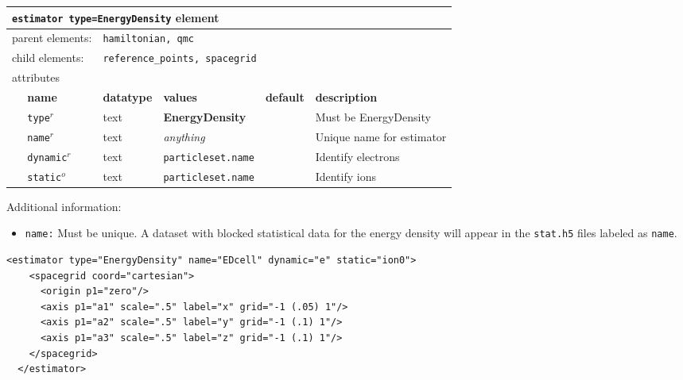 \FloatBarrier
\begin{table}[h]
\begin{center}
\begin{tabularx}{\textwidth}{l l l l l X }
\hline
\multicolumn{6}{l}{\texttt{estimator type=EnergyDensity} element} \\
\hline
\multicolumn{2}{l}{parent elements:} & \multicolumn{4}{l}{\texttt{hamiltonian, qmc}}\\
\multicolumn{2}{l}{child  elements:} & \multicolumn{4}{l}{\texttt{reference\_points, spacegrid}}\\
\multicolumn{2}{l}{attributes}  & \multicolumn{4}{l}{}\\
   &   \bfseries name     & \bfseries datatype & \bfseries values & \bfseries default   & \bfseries description \\
   & \texttt{type}$^r$    &  text              & \textbf{EnergyDensity}    &                  & Must be EnergyDensity     \\
   & \texttt{name}$^r$    &  text              & \textit{anything}         &                  & Unique name for estimator \\
   & \texttt{dynamic}$^r$ &  text              & \texttt{particleset.name} &                  & Identify electrons \\
   & \texttt{static}$^o$  &  text              & \texttt{particleset.name} &                  & Identify ions  \\
   
  \hline
\end{tabularx}
\end{center}
\end{table}
\FloatBarrier

Additional information:
\begin{itemize}
  \item{\texttt{name:}  Must be unique.  A dataset with blocked statistical data for the energy density will appear in the \texttt{stat.h5} files labeled as \texttt{name}.}
\end{itemize}


\begin{lstlisting}[style=QMCPXML,caption=Energy density estimator accumulated on a $20 \times  10 \times 10$ grid over the simulation cell.]
  <estimator type="EnergyDensity" name="EDcell" dynamic="e" static="ion0">
    <spacegrid coord="cartesian">
      <origin p1="zero"/>
      <axis p1="a1" scale=".5" label="x" grid="-1 (.05) 1"/>
      <axis p1="a2" scale=".5" label="y" grid="-1 (.1) 1"/>
      <axis p1="a3" scale=".5" label="z" grid="-1 (.1) 1"/>
    </spacegrid>
  </estimator>
\end{lstlisting}


